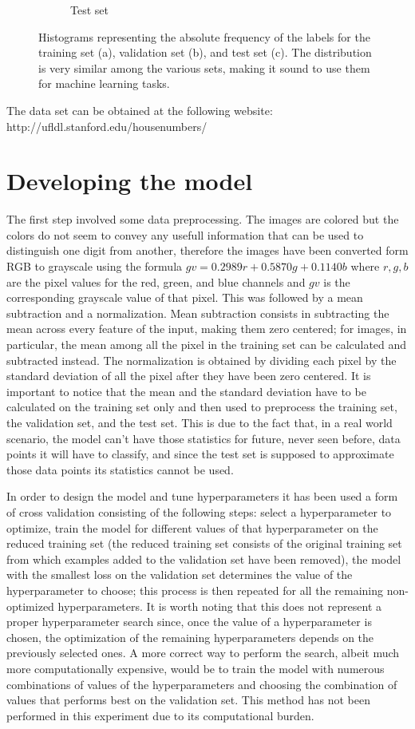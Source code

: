 \documentclass[12pt]{article}
\begin{document}
\begin{figure}[h]
\begin{subfigure}{0.31\textwidth}
		\caption{Test set}
		\label{fig:histc}
	\end{subfigure}
	\caption{Histograms representing the absolute frequency of the labels for the training set (a), validation set (b), and test set (c). The distribution is very similar among the various sets, making it sound to use them for machine learning tasks.}
	\label{fig:hist}
\end{figure}
The data set can be obtained at the following website: http://ufldl.stanford.edu/housenumbers/

\section*{Developing the model}

The first step involved some data preprocessing. The images are colored but the colors do not seem to convey any usefull information that can be used to distinguish one digit from another, therefore the images have been converted form RGB to grayscale using the formula $ gv = 0.2989r+0.5870g+0.1140b $ where $r, g, b$ are the pixel values for the red, green, and blue channels and $gv$ is the corresponding grayscale value of that pixel. This was followed by a mean subtraction and a normalization. Mean subtraction consists in subtracting the mean across every feature of the input, making them zero centered; for images, in particular, the mean among all the pixel in the training set can be calculated and subtracted instead. The normalization is obtained by dividing each pixel by the standard deviation of all the pixel after they have been zero centered. It is important to notice that the mean and the standard deviation have to be calculated on the training set only and then used to preprocess the training set, the validation set, and the test set. This is due to the fact that, in a real world scenario, the model can't have those statistics for future, never seen before, data points it will have to classify, and since the test set is supposed to approximate  those data points its statistics cannot be used.

In order to design the model and tune hyperparameters it has been used a form of cross validation consisting of the following steps: select a hyperparameter to optimize, train the model for different values of that hyperparameter on the reduced training set (the reduced training set consists of the original training set from which examples added to the validation set have been removed), the model with the smallest loss on the validation set determines the value of the hyperparameter to choose; this process is then repeated for all the remaining non-optimized hyperparameters. It is worth noting that this does not represent a proper hyperparameter search since, once the value of a hyperparameter is chosen, the optimization of the remaining hyperparameters depends on the previously selected ones. A more correct way to perform the search, albeit much more computationally expensive, would be to train the model with numerous combinations of values of the hyperparameters and choosing the combination of values that performs best on the validation set. This method has not been performed in this experiment due to its computational burden.
\end{document}
